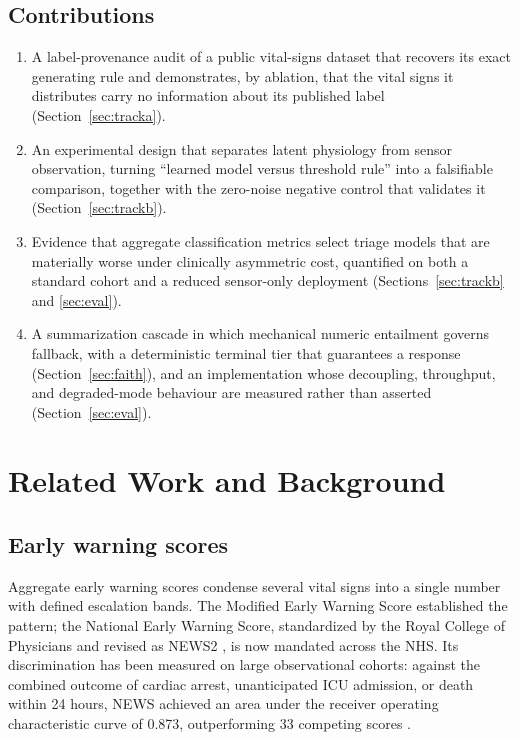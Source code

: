 \documentclass[lettersize,journal]{IEEEtran}
\begin{document}
\subsection{Contributions}

\begin{enumerate}
  \item A label-provenance audit of a public vital-signs dataset that recovers
        its exact generating rule and demonstrates, by ablation, that the vital
        signs it distributes carry no information about its published label
        (Section~\ref{sec:tracka}).
  \item An experimental design that separates latent physiology from sensor
        observation, turning ``learned model versus threshold rule'' into a
        falsifiable comparison, together with the zero-noise negative control
        that validates it (Section~\ref{sec:trackb}).
  \item Evidence that aggregate classification metrics select triage models that
        are materially worse under clinically asymmetric cost, quantified on
        both a standard cohort and a reduced sensor-only deployment
        (Sections~\ref{sec:trackb} and \ref{sec:eval}).
  \item A summarization cascade in which mechanical numeric entailment governs
        fallback, with a deterministic terminal tier that guarantees a response
        (Section~\ref{sec:faith}), and an implementation whose decoupling,
        throughput, and degraded-mode behaviour are measured rather than
        asserted (Section~\ref{sec:eval}).
\end{enumerate}

\section{Related Work and Background}
\label{sec:related}

\subsection{Early warning scores}

Aggregate early warning scores condense several vital signs into a single number
with defined escalation bands. The Modified Early Warning Score
\cite{subbe2001} established the pattern; the National Early Warning Score,
standardized by the Royal College of Physicians and revised as NEWS2
\cite{rcp2017}, is now mandated across the NHS. Its discrimination has been
measured on large observational cohorts: against the combined outcome of cardiac
arrest, unanticipated ICU admission, or death within 24 hours, NEWS achieved an
area under the receiver operating characteristic curve of 0.873, outperforming
33 competing scores \cite{smith2013}.
\end{document}
